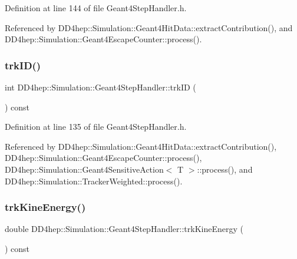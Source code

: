 Definition at line 144 of file Geant4\+Step\+Handler.\+h.



Referenced by D\+D4hep\+::\+Simulation\+::\+Geant4\+Hit\+Data\+::extract\+Contribution(), and D\+D4hep\+::\+Simulation\+::\+Geant4\+Escape\+Counter\+::process().

\hypertarget{class_d_d4hep_1_1_simulation_1_1_geant4_step_handler_aeebb8ecf7ce627d87e08d61b712e32b5}{}\label{class_d_d4hep_1_1_simulation_1_1_geant4_step_handler_aeebb8ecf7ce627d87e08d61b712e32b5} 
\subsubsection{\texorpdfstring{trk\+I\+D()}{trkID()}}
{\footnotesize\ttfamily int D\+D4hep\+::\+Simulation\+::\+Geant4\+Step\+Handler\+::trk\+ID (\begin{DoxyParamCaption}{ }\end{DoxyParamCaption}) const\hspace{0.3cm}{\ttfamily [inline]}}



Definition at line 135 of file Geant4\+Step\+Handler.\+h.



Referenced by D\+D4hep\+::\+Simulation\+::\+Geant4\+Hit\+Data\+::extract\+Contribution(), D\+D4hep\+::\+Simulation\+::\+Geant4\+Escape\+Counter\+::process(), D\+D4hep\+::\+Simulation\+::\+Geant4\+Sensitive\+Action$<$ T $>$\+::process(), and D\+D4hep\+::\+Simulation\+::\+Tracker\+Weighted\+::process().

\hypertarget{class_d_d4hep_1_1_simulation_1_1_geant4_step_handler_a9b1be56b8cea41c5e210cf2b53bf7763}{}\label{class_d_d4hep_1_1_simulation_1_1_geant4_step_handler_a9b1be56b8cea41c5e210cf2b53bf7763} 
\subsubsection{\texorpdfstring{trk\+Kine\+Energy()}{trkKineEnergy()}}
{\footnotesize\ttfamily double D\+D4hep\+::\+Simulation\+::\+Geant4\+Step\+Handler\+::trk\+Kine\+Energy (\begin{DoxyParamCaption}{ }\end{DoxyParamCaption}) const\hspace{0.3cm}{\ttfamily [inline]}}




